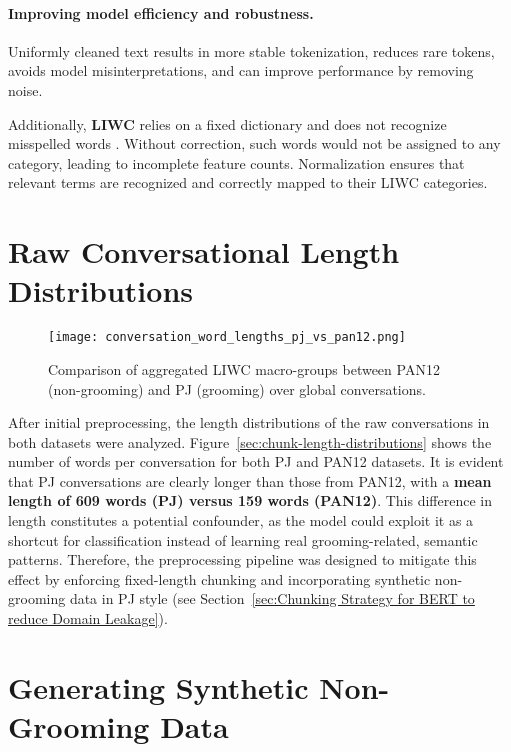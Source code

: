 \paragraph{Improving model efficiency and robustness.}  
Uniformly cleaned text results in more stable tokenization, reduces rare tokens, avoids model misinterpretations, and can improve performance by removing noise. \cite{sun-etal-2023-tokenization}

Additionally, \textbf{LIWC} relies on a fixed dictionary and does not recognize misspelled words \cite{pennebaker2022liwc}. Without correction, such words would not be assigned to any category, leading to incomplete feature counts. Normalization ensures that relevant terms are recognized and correctly mapped to their LIWC categories.

\section{Raw Conversational Length Distributions }

\begin{figure}[H]
    \centering
    \texttt{[image: conversation\_word\_lengths\_pj\_vs\_pan12.png]}
    \caption[Comparison of LIWC macro-groups]{Comparison of aggregated LIWC macro-groups between PAN12 (non-grooming) and PJ (grooming) over global conversations.}
    \label{fig:conversation_word_lengths}
\end{figure}

After initial preprocessing, the length distributions of the raw conversations in both datasets were analyzed. Figure~\ref{sec:chunk-length-distributions} shows the number of words per conversation for both PJ and PAN12 datasets. It is evident that PJ conversations are clearly longer than those from PAN12, with a \textbf{mean length of 609 words (PJ) versus 159 words (PAN12)}. This difference in length constitutes a potential confounder, as the model could exploit it as a shortcut for classification instead of learning real grooming-related, semantic patterns. Therefore, the preprocessing pipeline was designed to mitigate this effect by enforcing fixed-length chunking and incorporating synthetic non-grooming data in PJ style (see Section~\ref{sec:Chunking Strategy for BERT to reduce Domain Leakage}).


\section{Generating Synthetic Non-Grooming Data}\label{sec:synthetic-data}

